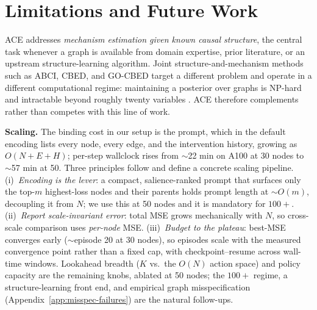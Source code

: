 \documentclass{article}
\theoremstyle{plain}
\theoremstyle{definition}
\theoremstyle{remark}
\begin{document}
\section{Limitations and Future Work}

\label{sec:limitations}
ACE addresses \emph{mechanism estimation given known causal structure}, the central task whenever a graph is available from domain expertise, prior literature, or an upstream structure-learning algorithm. Joint structure-and-mechanism methods such as ABCI, CBED, and GO-CBED target a different problem and operate in a different computational regime: maintaining a posterior over graphs is NP-hard \citep{chickering1996learning} and intractable beyond roughly twenty variables \citep{zhou2024sample}. ACE therefore complements rather than competes with this line of work.

\textbf{Scaling.} The binding cost in our setup is the prompt, which in the default encoding lists every node, every edge, and the intervention history, growing as $O(N\!+\!E\!+\!H)$; per-step wallclock rises from $\sim$22 min on A100 at 30 nodes to $\sim$57 min at 50. Three principles follow and define a concrete scaling pipeline. (i)~\emph{Encoding is the lever}: a compact, salience-ranked prompt that surfaces only the top-$m$ highest-loss nodes and their parents holds prompt length at $\sim\!O(m)$, decoupling it from $N$; we use this at 50 nodes and it is mandatory for $100+$. (ii)~\emph{Report scale-invariant error}: total MSE grows mechanically with $N$, so cross-scale comparison uses \emph{per-node} MSE. (iii)~\emph{Budget to the plateau}: best-MSE converges early ($\sim$episode 20 at 30 nodes), so episodes scale with the measured convergence point rather than a fixed cap, with checkpoint--resume across wall-time windows. Lookahead breadth ($K$ vs.\ the $O(N)$ action space) and policy capacity are the remaining knobs, ablated at 50 nodes; the $100+$ regime, a structure-learning front end, and empirical graph misspecification (Appendix~\ref{app:misspec-failures}) are the natural follow-ups.
\end{document}
